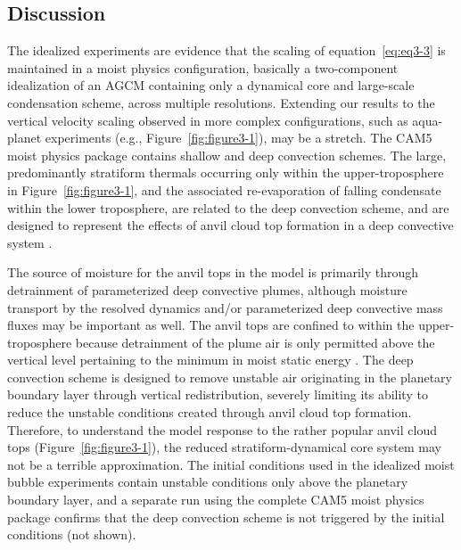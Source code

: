 \subsection{Discussion}
The idealized experiments are evidence that the scaling of equation~\ref{eq:eq3-3} is maintained in a moist physics configuration, basically a two-component idealization of an AGCM containing only a dynamical core and large-scale condensation scheme, across multiple resolutions. Extending our results to the vertical velocity scaling observed in more complex configurations, such as aqua-planet experiments (e.g., Figure~\ref{fig:figure3-1}), may be a stretch. The CAM5 moist physics package contains shallow \citep{PB2009JC} and deep \citep{ZM1995AO,RR2008JC,NRJ2008JC} convection schemes. The large, predominantly stratiform thermals occurring only within the upper-troposphere in Figure~\ref{fig:figure3-1}, and the associated re-evaporation of falling condensate within the lower troposphere, are related to the deep convection scheme, and are designed to represent the effects of anvil cloud top formation in a deep convective system \citep{CAM5,PETAL2014JCLIM}. 

The source of moisture for the anvil tops in the model is primarily through detrainment of parameterized deep convective plumes, although moisture transport by the resolved dynamics and/or parameterized deep convective mass fluxes may be important as well. The anvil tops are confined to within the upper-troposphere because detrainment of the plume air is only permitted above the vertical level pertaining to the minimum in moist static energy \citep{ZM1995AO}. The deep convection scheme is designed to remove unstable air originating in the planetary boundary layer through vertical redistribution, severely limiting its ability to reduce the unstable conditions created through anvil cloud top formation. Therefore, to understand the model response to the rather popular anvil cloud tops (Figure~\ref{fig:figure3-1}), the reduced stratiform-dynamical core system may not be a terrible approximation. The initial conditions used in the idealized moist bubble experiments contain unstable conditions only above the planetary boundary layer, and a separate run using the complete CAM5 moist physics package confirms that the deep convection scheme is not triggered by the initial conditions (not shown).

